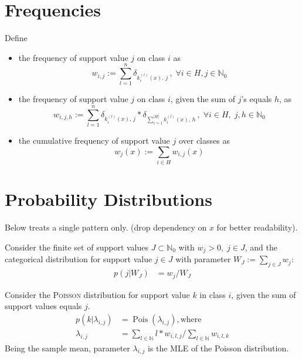 \documentclass[a4paper,10pt]{article}
\begin{document}
\section{Frequencies}
Define
\begin{itemize}
  \item the frequency of support value $j$ on class $i$ as 
    \begin{equation*}
        w_{i,j}:=\sum_{l=1}^n \delta_{k_i^{(l)}(x),\, j}\, , \; \forall i \in H, j \in \mathbb{N}_0
    \end{equation*}
  \item the frequency of support value $j$ on class $i$, given the sum of $j$'s equals $h$, as 
    \begin{equation*}
      w_{i,j,h}:=\sum_{l=1}^n \delta_{k_i^{(l)}(x),\, j} * \delta_{\sum_{i=1}^{\vert H \vert}k_i^{(l)}(x),\, h}\, , \; \forall i \in H, \; j,h \in \mathbb{N}_0
    \end{equation*}
  \item the cumulative frequency of support value $j$ over classes as 
    \begin{equation*}
      w_j(x):=\sum_{i \in H}w_{i,j}(x)
    \end{equation*}
\end{itemize}

\section{Probability Distributions}
Below treats a single pattern only. (drop dependency on $x$ for better readability).

Consider the finite set of support values $J \subset \mathbb{N}_0$ with $w_j > 0, \; j \in J$, and the categorical distribution for support value $j \in J$ with parameter $W_J:=\sum_{j \in J} w_j$:
\begin{align*}
  p(j|W_J) &= w_j/W_J
\end{align*}

Consider the \textsc{Poisson} distribution for support value $k$ in class $i$, given the sum of support values equals $j$.
\begin{align*}
  p(k\vert\lambda_{i,j}) &= \operatorname{Pois}\left(\lambda_{i,j}\right), \text{where}\\
  \lambda_{i,j}&=\sum_{l \in \mathbb{N}} l*w_{i,l,j} / \sum_{l \in \mathbb{N}} w_{i,l,k}
\end{align*}
Being the sample mean, parameter $\lambda_{i,j}$ is the MLE of the Poisson distribution.
\end{document}
